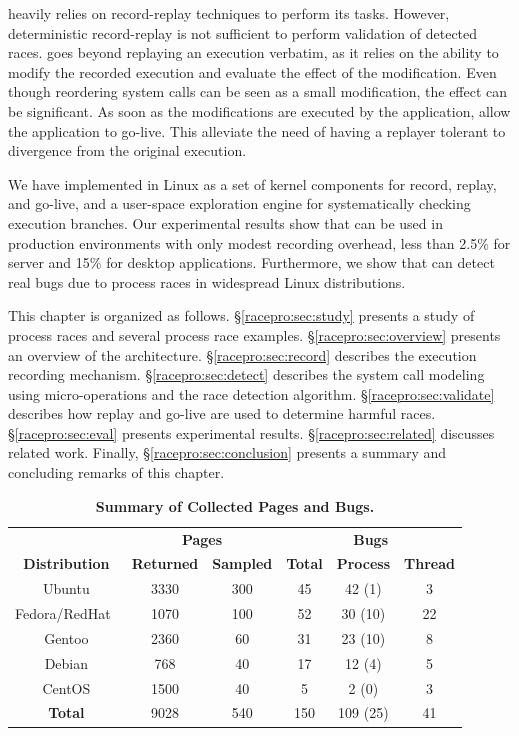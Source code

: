 \racepro heavily relies on record-replay techniques to perform its tasks.
However, deterministic record-replay is not sufficient to perform validation of
detected races. \racepro goes beyond replaying an execution verbatim,
as it relies on the ability to modify the recorded execution and evaluate the
effect of the modification. Even though reordering system calls can be seen as a
small modification, the effect can be significant. As soon as the modifications
are executed by the application, \racepro allow the application to go-live.
This alleviate the need of having a replayer tolerant to divergence from
the original execution.

We have implemented \racepro in Linux as a set of kernel components for
record, replay, and go-live, and a user-space exploration engine for
systematically checking execution branches.  Our experimental results
show that \racepro can be used in production environments with only
modest recording overhead, less than 2.5\% for server and 15\% for
desktop applications.  Furthermore, we show that \racepro can detect
\nracepro real bugs due to process races in widespread Linux
distributions. 

This chapter is organized as follows.  \S\ref{racepro:sec:study} presents a
study of process races and several process race examples.
\S\ref{racepro:sec:overview} presents an overview of the \racepro architecture.
\S\ref{racepro:sec:record} describes the execution recording mechanism.
\S\ref{racepro:sec:detect} describes  the system call modeling using
micro-operations and the race detection algorithm.
\S\ref{racepro:sec:validate} describes how replay and go-live are used to
determine harmful races.  \S\ref{racepro:sec:eval} presents experimental
results. \S\ref{racepro:sec:related} discusses related work.
Finally, \S\ref{racepro:sec:conclusion} presents a summary and concluding remarks of this chapter.

\begin{table}[t]
\centering
\begin{tabular}{c|cc|ccc}
  \toprule
                                    & \multicolumn{2}{c|}{\bf Pages} & \multicolumn{3}{c}{\bf Bugs} \\
  {\bf Distribution} & {\bf Returned} & {\bf Sampled} & {\bf Total} & {\bf Process} & {\bf Thread} \\ \midrule
  Ubuntu              & 3330 & 300  & 45  & 42 (1)   & 3   \\
  Fedora/RedHat\,\,\, & 1070 & 100  & 52  & 30 (10)  & 22  \\
  Gentoo              & 2360 & 60   & 31  & 23 (10)  & 8   \\
  Debian              & 768  & 40   & 17  & 12 (4)   & 5   \\
  CentOS              & 1500 & 40   & 5   & 2 (0)    & 3   \\
  \midrule
  {\bf Total}         & 9028 & 540  & 150 & 109 (25) & 41  \\
  \bottomrule
\end{tabular}
\caption{{\bf Summary of Collected Pages and Bugs.}}
\label{racepro:tab:data}
\end{table}


